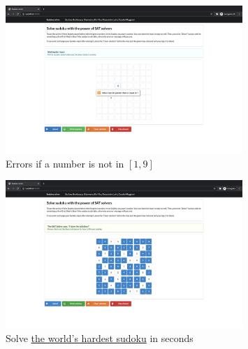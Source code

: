 \documentclass[]{usiinfprospectus}
\begin{document}
\begin{figure}[ht]
\caption{Errors if a number is not in $ \left[ 1, 9 \right] $}
\centering
\includegraphics[width=0.8\textwidth]{pics/input_check.png}
\end{figure}

\begin{figure}[ht]
\caption{Solve \href{https://www.mirror.co.uk/news/weird-news/worlds-hardest-sudoku-can-you-242294}{the world's hardest sudoku} in seconds}
\centering
\includegraphics[width=0.8\textwidth]{pics/hardest_sudoku.png}
\end{figure}



\end{document}
